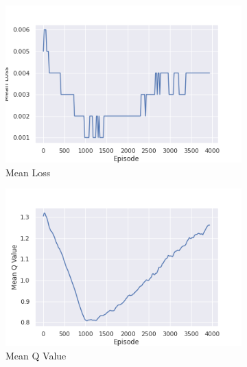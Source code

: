 \begin{appendices}
\begin{figure}[h]
        \\
        \begin{subfigure}{0.49\linewidth}
            \centering{}
            \includegraphics[width=\linewidth, height=0.3\textheight, keepaspectratio]{img/result_img/mean_loss.png}
            \caption{Mean Loss}
        \end{subfigure}
        \begin{subfigure}{0.49\linewidth}
            \centering{}
            \includegraphics[width=\linewidth, height=0.3\textheight, keepaspectratio]{img/result_img/mean_q_value.png}
            \caption{Mean Q Value}
        \end{subfigure}
        \\
        \begin{subfigure}{0.49\linewidth}
            \centering{}

\end{subfigure}
\end{figure}
\end{appendices}
